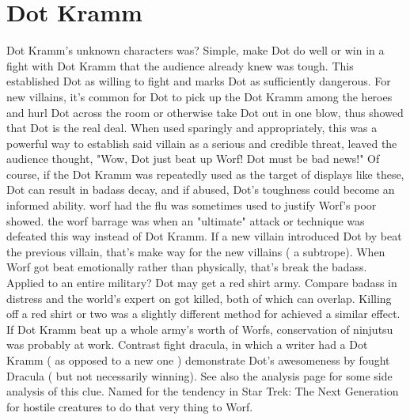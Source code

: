 \documentclass[12pt]{book}
\begin{document}
\chapter{Dot Kramm}
Dot Kramm's unknown characters was? Simple, make Dot do well or win in a fight with Dot Kramm that the audience already knew was tough. This established Dot as willing to fight and marks Dot as sufficiently dangerous. For new villains, it's common for Dot to pick up the Dot Kramm among the heroes and hurl Dot across the room or otherwise take Dot out in one blow, thus showed that Dot is the real deal. When used sparingly and appropriately, this was a powerful way to establish said villain as a serious and credible threat, leaved the audience thought, "Wow, Dot just beat up Worf! Dot must be bad news!" Of course, if the Dot Kramm was repeatedly used as the target of displays like these, Dot can result in badass decay, and if abused, Dot's toughness could become an informed ability. worf had the flu was sometimes used to justify Worf's poor showed. the worf barrage was when an "ultimate" attack or technique was defeated this way instead of Dot Kramm. If a new villain introduced Dot by beat the previous villain, that's make way for the new villains ( a subtrope). When Worf got beat emotionally rather than physically, that's break the badass. Applied to an entire military? Dot may get a red shirt army. Compare badass in distress and the world's expert on got killed, both of which can overlap. Killing off a red shirt or two was a slightly different method for achieved a similar effect. If Dot Kramm beat up a whole army's worth of Worfs, conservation of ninjutsu was probably at work. Contrast fight dracula, in which a writer had a Dot Kramm ( as opposed to a new one ) demonstrate Dot's awesomeness by fought Dracula ( but not necessarily winning). See also the analysis page for some side analysis of this clue. Named for the tendency in Star Trek: The Next Generation for hostile creatures to do that very thing to Worf.
\end{document}

